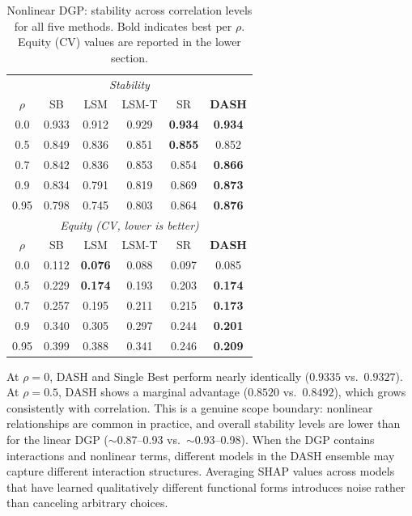 \documentclass[11pt]{article}
\newcommand{\dash}{\textsc{DASH}}
\newcommand{\rhovar}{\rho}
\begin{document}
\begin{table}[htbp]
\centering
\caption{Nonlinear DGP: stability across correlation levels for all five methods.
Bold indicates best per $\rhovar$. Equity (CV) values are reported in the lower section.}
\label{tab:nonlinear}
\begin{tabular}{cccccc}
\toprule
\multicolumn{6}{c}{\textit{Stability}} \\
$\rhovar$ & SB & LSM & LSM-T & SR & \textbf{DASH} \\
\midrule
0.0  & 0.933 & 0.912 & 0.929 & \textbf{0.934} & \textbf{0.934} \\
0.5  & 0.849 & 0.836 & 0.851 & \textbf{0.855} & 0.852 \\
0.7  & 0.842 & 0.836 & 0.853 & 0.854 & \textbf{0.866} \\
0.9  & 0.834 & 0.791 & 0.819 & 0.869 & \textbf{0.873} \\
0.95 & 0.798 & 0.745 & 0.803 & 0.864 & \textbf{0.876} \\
\midrule
\multicolumn{6}{c}{\textit{Equity (CV, lower is better)}} \\
$\rhovar$ & SB & LSM & LSM-T & SR & \textbf{DASH} \\
\midrule
0.0  & 0.112 & \textbf{0.076} & 0.088 & 0.097 & 0.085 \\
0.5  & 0.229 & \textbf{0.174} & 0.193 & 0.203 & \textbf{0.174} \\
0.7  & 0.257 & 0.195 & 0.211 & 0.215 & \textbf{0.173} \\
0.9  & 0.340 & 0.305 & 0.297 & 0.244 & \textbf{0.201} \\
0.95 & 0.399 & 0.388 & 0.341 & 0.246 & \textbf{0.209} \\
\bottomrule
\end{tabular}
\end{table}

At $\rhovar = 0$, \dash{} and Single Best perform nearly identically
($0.9335$ vs.\ $0.9327$). At $\rhovar = 0.5$, \dash{} shows a marginal
advantage ($0.8520$ vs.\ $0.8492$), which grows consistently with
correlation. This is a genuine scope boundary: nonlinear relationships
are common in practice, and overall stability levels are lower than for
the linear DGP ($\sim$0.87--0.93 vs.\ $\sim$0.93--0.98). When the DGP
contains interactions and nonlinear terms, different models in the DASH
ensemble may capture different interaction structures. Averaging SHAP
values across models that have learned qualitatively different functional
forms introduces noise rather than canceling arbitrary choices.
\end{document}
